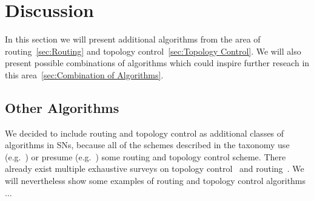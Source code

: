 
\section{Discussion}
\label{sec:Discussion}

In this section we will present additional algorithms from the area of
routing~\ref{sec:Routing} and topology control~\ref{sec:Topology Control}. We
will also present possible combinations of algorithms which could inspire
further reseach in this area~\ref{sec:Combination of Algorithms}.

\subsection{Other Algorithms}
\label{sec:Other Algorithms}

We decided to include routing and topology control as additional classes of
algorithms in \acp{SN}, because all of the schemes described in the taxonomy
use (e.g.~\cite{padhy2006utility}) or presume
(e.g.~\cite{silberstein2006constraint}) some routing and topology control
scheme. There already exist multiple exhaustive surveys on topology
control~\cite{aziz2013survey, li2013survey} and routing~\cite{al2004routing,
pantazis2013energy, singh2010routing}. We will nevertheless show some examples
of routing and topology control algorithms ...


